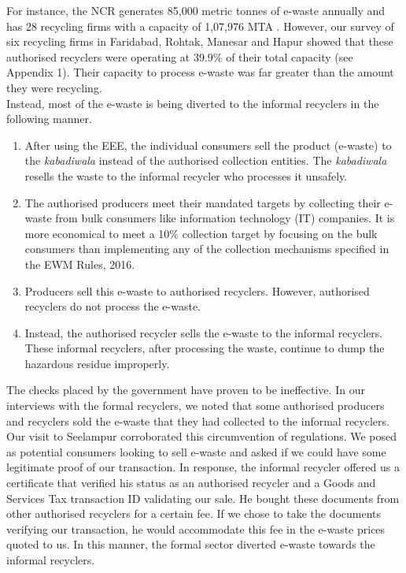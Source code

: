 \documentclass[a4paper, 12pt]{article}
\begin{document}
                    For instance, the NCR generates 85,000 metric tonnes of e-waste annually and has 28 recycling firms with a capacity of 1,07,976 MTA \parencite{assochamdelhi, cpcbrecyclersreport}. However, our survey of six recycling firms in Faridabad, Rohtak, Manesar and Hapur showed that these authorised recyclers were operating at 39.9\% of their total capacity (see Appendix 1). Their capacity to process e-waste was far greater than the amount they were recycling. \\
                    
                    Instead, most of the e-waste is being diverted to the informal recyclers in the following manner.                    
                    \begin{enumerate}
                      \item After using the EEE, the individual consumers sell the product (e-waste) to the \textit{kabadiwala} instead of the authorised collection entities. The \textit{kabadiwala} resells the waste to the informal recycler who processes it unsafely. 
                      \item The authorised producers meet their mandated targets by collecting their e-waste from bulk consumers like information technology (IT) companies. It is more economical to meet a 10\% collection target by focusing on the bulk consumers than implementing any of the collection mechanisms specified in the EWM Rules, 2016.
                      \item Producers sell this e-waste to authorised recyclers. However, authorised recyclers do not process the e-waste.  
                      \item Instead, the authorised recycler sells the e-waste to the informal recyclers. These informal recyclers, after processing the waste, continue to dump the hazardous residue improperly.
                    \end{enumerate}
                    
                    The checks placed by the government have proven to be ineffective. In our interviews with the formal recyclers, we noted that some authorised producers and recyclers sold the e-waste that they had collected to the informal recyclers. \\
                    
                    Our visit to Seelampur corroborated this circumvention of regulations. We posed as potential consumers looking to sell e-waste and asked if we could have some legitimate proof of our transaction. In response, the informal recycler offered us a certificate that verified his status as an authorised recycler and a Goods and Services Tax transaction ID validating our sale. He bought these documents from other authorised recyclers for a certain fee. If we chose to take the documents verifying our transaction, he would accommodate this fee in the e-waste prices quoted to us. In this manner, the formal sector diverted e-waste towards the informal recyclers. \\
                    
\end{document}
